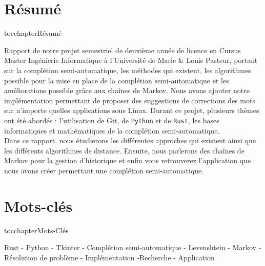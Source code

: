 \documentclass[a4paper, 11pt]{report}
\newcommand{\langage}[1]{\texttt{#1}}
\begin{document}
{\begin{center}
	\section*{Résumé}
	\addcontentsline
	{toc}{chapter}{Résumé}
	\begin{justify}
		Rapport de notre projet semestriel de deuxième année de licence en Cursus Master Ingénierie Informatique à l’Université de Marie \& Louis Pasteur, portant sur la complétion semi-automatique, les méthodes qui existent, les algorithmes possible pour la mise en place de la complétion semi-automatique et les améliorations possible grâce aux chaînes de Markov. Nous avons ajouter notre implémentation permettant de proposer des suggestions de corrections des mots sur n'importe quelles applications sous Linux. Durant ce projet, plusieurs thèmes ont été abordés : l'utilisation de Git, de \langage{Python} et de \langage{Rust}, les bases informatiques et mathématiques de la complétion semi-automatique.\\
		Dans ce rapport, nous étudierons les différentes approches qui existent ainsi que  les différents algorithmes de distance. Ensuite, nous parlerons  des chaînes de Markov pour la gestion d'historique et enfin vous retrouverez l'application que nous avons créer permettant une complétion semi-automatique.

	\end{justify}
	\vspace*{\fill} %

	\section*{Mots-clés}
	\addcontentsline
	{toc}{chapter}{Mots-Clés}
	\begin{justify}
		Rust - Python - Tkinter - Complétion semi-automatique - Levenshtein - Markov - Résolution de problème - Implémentation -Recherche - Application
	\end{justify}
	\vspace*{\fill} %


\end{center}}
\end{document}
